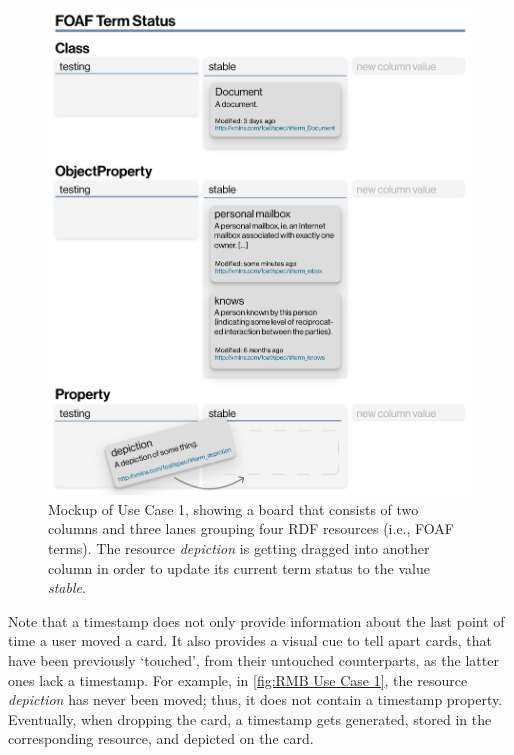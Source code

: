\begin{figure}[ht]
    \libertineLF
    \centering
    \includegraphics[width=142mm]{img/31-UseCase1.pdf}
	\caption[ Mockup of Use Case 1]{ Mockup of Use Case 1, showing a board that consists of two columns and three lanes grouping four \acrshort*{RDF} resources (i.e., \acrshort*{FOAF} terms). The resource \textit{depiction} is getting dragged into another column in order to update its current term status to the value \textit{stable}.}
	\label{fig:RMB Use Case 1}
	\libertineOsF
\end{figure}


\noindent Note that a timestamp does not only provide information about the last point of time a user moved a card. It also provides a visual cue to tell apart cards, that have been previously ‘touched’, from their untouched counterparts, as the latter ones lack a timestamp. For example, in \autoref{fig:RMB Use Case 1}, the resource \textit{depiction} has never been moved; thus, it does not contain a timestamp property. Eventually, when dropping the card, a timestamp gets generated, stored in the corresponding resource, and depicted on the card.